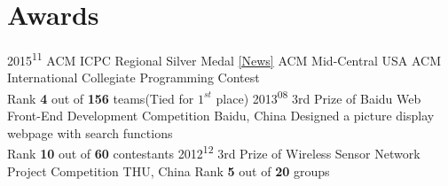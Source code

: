 \documentclass[]{Shidi-Zhao}
\begin{document}
\section{Awards}
\begin{entrylist}
\entry
{2015\textsuperscript{11}}
{ACM ICPC Regional Silver Medal \href{http://www.mccormick.northwestern.edu/eecs/news/articles/2015/eecs-teams-earn-top-10-finish-in-mid-central-regional-acm-icpc.html}{[News]}}
{ACM Mid-Central USA}
{ACM International Collegiate Programming Contest\\
Rank \textbf{4} out of \textbf{156} teams(Tied for $1^{st}$ place)
}  
\entry
{2013\textsuperscript{08}}
{3rd Prize of Baidu Web Front-End Development Competition}
{Baidu, China}
{Designed a picture display webpage with search functions\\
Rank \textbf{10} out of \textbf{60} contestants}
\entry
{2012\textsuperscript{12}}
{3rd Prize of Wireless Sensor Network Project Competition}
{THU, China}
{
Rank \textbf{5} out of \textbf{20} groups}
\end{entrylist}
\end{document}
